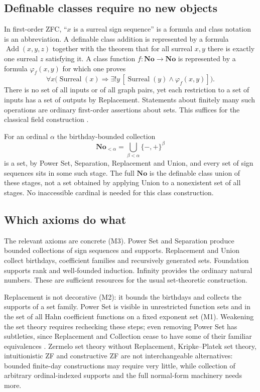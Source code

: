 \documentclass[11pt,letterpaper]{article}
\numberwithin{equation}{section}
\theoremstyle{definition}
\theoremstyle{remark}
\newcommand{\No}{\mathbf{No}}
\begin{document}
\subsection{Definable classes require no new objects}
\label{found:sub:definable}
In first-order ZFC, ``$x$ is a surreal sign sequence'' is a formula and class
notation is an abbreviation. A definable class addition is represented by a
formula $\operatorname{Add}(x,y,z)$ together with the theorem that for all
surreal $x,y$ there is exactly one surreal $z$ satisfying it. A class function
$f:\No\to\No$ is represented by a formula $\varphi_f(x,y)$ for which one proves
\[
 \forall x\bigl(\operatorname{Surreal}(x)\Rightarrow
 \exists!y\,[\operatorname{Surreal}(y)\land\varphi_f(x,y)]\bigr).
\]
There is no set of all inputs or of all graph pairs, yet each restriction to a
set of inputs has a set of outputs by Replacement. Statements about finitely
many such operations are ordinary first-order assertions about sets. This
suffices for the classical field construction
\cite{found:Conway,found:Gonshor}.

For an ordinal $\alpha$ the birthday-bounded collection
\[
 \No_{<\alpha}=\bigcup_{\beta<\alpha}\{-,+\}^{\beta}
\]
is a set, by Power Set, Separation, Replacement and Union, and every set of
sign sequences sits in some such stage. The full $\No$ is the definable class
union of these stages, not a set obtained by applying Union to a nonexistent
set of all stages. No inaccessible cardinal is needed for this class
construction.

\subsection{Which axioms do what}
\label{found:sub:whichaxioms}
The relevant axioms are concrete (M3). Power Set and Separation produce bounded
collections of sign sequences and supports. Replacement and Union collect
birthdays, coefficient families and recursively generated sets. Foundation
supports rank and well-founded induction. Infinity provides the ordinary
natural numbers. These are sufficient resources for the usual set-theoretic
construction.

Replacement is not decorative (M2): it bounds the birthdays and collects the
supports of a set family. Power Set is visible in unrestricted function sets and
in the set of all Hahn coefficient functions on a fixed exponent set (M1).
Weakening the set theory requires rechecking these steps; even removing Power
Set has subtleties, since Replacement and Collection cease to have some of
their familiar equivalences \cite{found:ZFCminus}. Zermelo set theory without
Replacement, Kripke--Platek set theory, intuitionistic ZF and constructive ZF
are not interchangeable alternatives: bounded finite-day constructions may
require very little, while collection of arbitrary ordinal-indexed supports and
the full normal-form machinery needs more.
\end{document}
